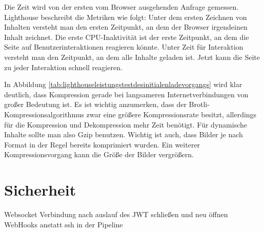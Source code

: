 Die Zeit wird von der ersten vom Browser ausgehenden Anfrage gemessen.
Lighthouse beschreibt die Metriken wie folgt: Unter dem ersten Zeichnen
von Inhalten versteht man den ersten Zeitpunkt, an dem der Browser
irgendeinen Inhalt zeichnet. Die erste CPU-Inaktivität ist
der erste Zeitpunkt, an dem die Seite auf Benutzerinteraktionen reagieren könnte.
Unter Zeit für Interaktion versteht man den Zeitpunkt, an dem alle Inhalte geladen ist.
Jetzt kann die Seite zu jeder Interaktion schnell reagieren.\cite{WhatPerformanceMetricsMeasure}

In Abbildung \ref{tab:lighthouseleistungstestdesinitialenladevorgangs} wird klar deutlich,
dass Kompression gerade bei langsameren Internetverbindungen von großer Bedeutung ist.
Es ist wichtig anzumerken, dass der Brotli-Kompressionsalgorithmus zwar eine größere
Kompressionsrate besitzt, allerdings für die Kompression und Dekompression mehr Zeit
benötigt.\cite{CompressionBenchmark} Für dynamische Inhalte sollte man also Gzip
benutzen. Wichtig ist auch, dass Bilder je nach Format in der Regel bereits komprimiert wurden.
Ein weiterer Kompressionsvorgang kann die Größe der Bilder vergrößern.

\section{Sicherheit}
\label{sec:sicherheit}
Websocket Verbindung nach auslauf des JWT schließen und neu öffnen
WebHooks anstatt ssh in der Pipeline




